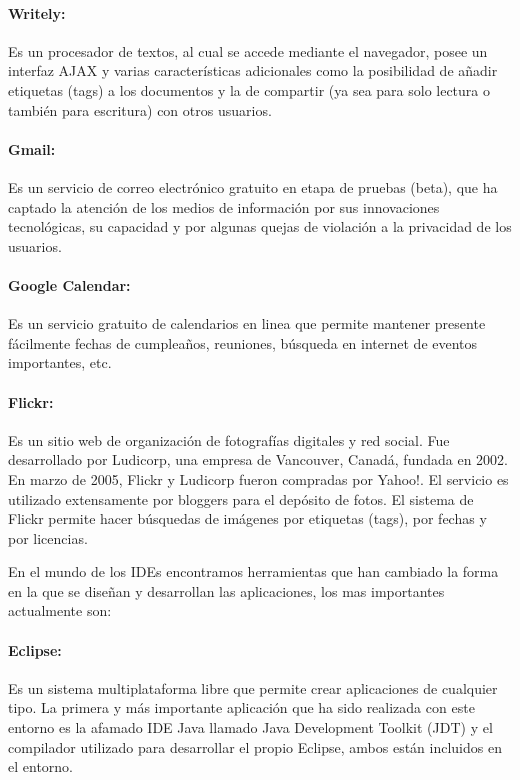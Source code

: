 \paragraph{Writely: \cite{writely}} Es un procesador de textos, al cual se accede mediante el navegador, posee un interfaz AJAX y varias características adicionales como la posibilidad de añadir etiquetas (tags) a los documentos y la de compartir (ya sea para solo lectura o también para escritura) con otros usuarios.

\paragraph{Gmail: \cite{gmail}} Es un servicio de correo electrónico gratuito en etapa de pruebas (beta), que ha captado la atención de los medios de información por sus innovaciones tecnológicas, su capacidad y por algunas quejas de violación a la privacidad de los usuarios.

\paragraph{Google Calendar: \cite{google_calendar}} Es un servicio gratuito de calendarios en linea que permite mantener presente fácilmente fechas de cumpleaños, reuniones, búsqueda en internet de eventos importantes, etc.

\paragraph{Flickr: \cite{flickr}} Es un sitio web de organización de fotografías digitales y red social. Fue desarrollado por Ludicorp, una empresa de Vancouver, Canadá, fundada en 2002. En marzo de 2005, Flickr y Ludicorp fueron compradas por Yahoo!. El servicio es utilizado extensamente por bloggers para el depósito de fotos. El sistema de Flickr permite hacer búsquedas de imágenes por etiquetas (tags), por fechas y por licencias.


En el mundo de los IDEs encontramos herramientas que han cambiado la forma en la que se diseñan y desarrollan las aplicaciones, los mas importantes actualmente son:


\paragraph{Eclipse: \cite{eclipse}} Es un sistema multiplataforma libre que permite crear aplicaciones de cualquier tipo. La primera y más importante aplicación que ha sido realizada con este entorno es la afamado IDE Java llamado Java Development Toolkit (JDT) y el compilador utilizado para desarrollar el propio Eclipse, ambos están incluidos en el entorno.

